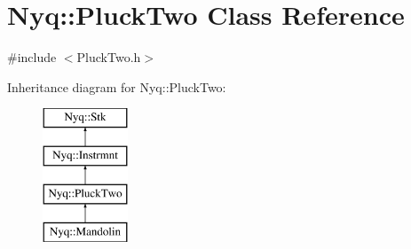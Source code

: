 \hypertarget{class_nyq_1_1_pluck_two}{}\section{Nyq\+:\+:Pluck\+Two Class Reference}
\label{class_nyq_1_1_pluck_two}


{\ttfamily \#include $<$Pluck\+Two.\+h$>$}

Inheritance diagram for Nyq\+:\+:Pluck\+Two\+:\begin{figure}[H]
\begin{center}
\leavevmode
\includegraphics[height=4.000000cm]{class_nyq_1_1_pluck_two}
\end{center}
\end{figure}
